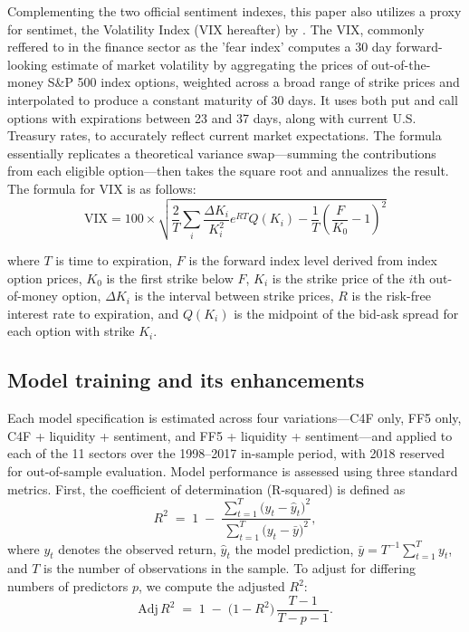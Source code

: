 Complementing the two official sentiment indexes, this paper also utilizes a proxy for sentimet, the Volatility Index (VIX hereafter) by . The VIX, commonly reffered to in the finance sector as the 'fear index' computes a 30 day forward-looking estimate of market volatility by aggregating the prices of out-of-the-money S\&P 500 index options, weighted across a broad range of strike prices and interpolated to produce a constant maturity of 30 days. It uses both put and call options with expirations between 23 and 37 days, along with current U.S. Treasury rates, to accurately reflect current market expectations. The formula essentially replicates a theoretical variance swap—summing the contributions from each eligible option—then takes the square root and annualizes the result. The formula for VIX is as follows:
\begin{equation}
    \label{eq:vix}
    \text{VIX} = 100 \times \sqrt{\frac{2}{T} \sum_i \frac{\Delta K_i}{K_i^2} e^{RT} Q(K_i) - \frac{1}{T} \left(\frac{F}{K_0} - 1\right)^2}
\end{equation}

where $T$ is time to expiration, $F$ is the forward index level derived from index option prices, $K_0$ is the first strike below $F$, $K_i$ is the strike price of the $i$th out-of-money option, $\Delta K_i$ is the interval between strike prices, $R$ is the risk-free interest rate to expiration, and $Q(K_i)$ is the midpoint of the bid-ask spread for each option with strike $K_i$.

 
\subsection{Model training and its enhancements}

Each model specification is estimated across four variations—C4F only, FF5 only, C4F + liquidity + sentiment, and FF5 + liquidity + sentiment—and applied to each of the 11 sectors over the 1998–2017 in-sample period, with 2018 reserved for out-of-sample evaluation.  Model performance is assessed using three standard metrics.  First, the coefficient of determination (R-squared) is defined as  
\begin{equation}
\label{eq:rsquared}
R^2 \;=\; 1 \;-\; \frac{\sum_{t=1}^{T}\bigl(y_{t}-\hat y_{t}\bigr)^2}{\sum_{t=1}^{T}\bigl(y_{t}-\bar y\bigr)^2},
\end{equation}  
where \(y_t\) denotes the observed return, \(\hat y_t\) the model prediction, \(\bar y = T^{-1}\sum_{t=1}^T y_t\), and \(T\) is the number of observations in the sample.  To adjust for differing numbers of predictors \(p\), we compute the adjusted \(R^2\):  
\begin{equation}
\label{eq:adjrsquared}
\mathrm{Adj}\,R^2 \;=\; 1 \;-\; \bigl(1 - R^2\bigr)\,\frac{T - 1}{T - p - 1}.
\end{equation}  


